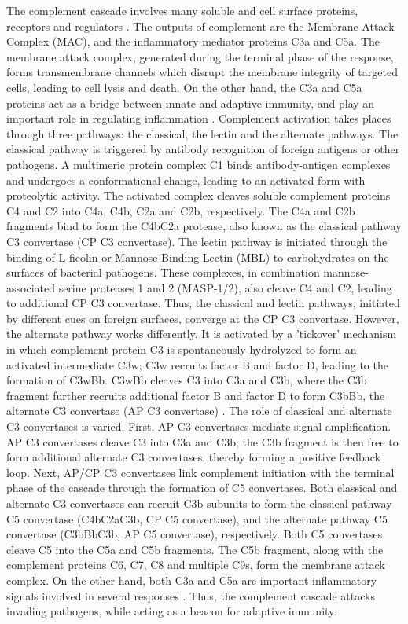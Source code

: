 \documentclass[12pt]{article}
\begin{document}
The complement cascade involves many soluble and cell surface proteins, receptors and regulators \cite{Walport:2001ab,Walport:2001aa}.
The outputs of complement are the Membrane Attack Complex (MAC), and the inflammatory mediator proteins C3a and C5a.
The membrane attack complex, generated during the terminal phase of the response,
forms transmembrane channels which disrupt the membrane integrity of targeted cells, leading to cell lysis and death.
On the other hand, the C3a and C5a proteins act as a bridge between innate and adaptive immunity, and play an important role in regulating inflammation \cite{sarma2011complement}.
Complement activation takes places through three pathways: the classical, the lectin and the alternate pathways.
The classical pathway is triggered by antibody recognition of foreign antigens or other pathogens.
A multimeric protein complex C1 binds antibody-antigen complexes and undergoes a conformational change, leading to an activated form with proteolytic activity.
The activated complex cleaves soluble complement proteins C4 and C2 into C4a, C4b, C2a and C2b, respectively.
The C4a and C2b fragments bind to form the C4bC2a protease, also known as the classical pathway C3 convertase (CP C3 convertase).
The lectin pathway is initiated through the binding of L-ficolin or Mannose Binding Lectin (MBL) to carbohydrates on the surfaces of bacterial pathogens.
These complexes, in combination mannose-associated serine proteases
1 and 2 (MASP-1/2), also cleave C4 and C2, leading to additional CP C3 convertase.
Thus, the classical and lectin pathways, initiated by different cues on foreign surfaces,  converge at the CP C3 convertase.
However, the alternate pathway works differently. It is activated by a 'tickover' mechanism in which complement protein C3 is spontaneously hydrolyzed to form an activated intermediate C3w;
C3w recruits factor B and factor D, leading to the formation of C3wBb. C3wBb cleaves C3 into C3a and C3b, where
the C3b fragment further recruits additional factor B and factor D to form C3bBb, the alternate C3 convertase (AP C3 convertase) \cite{pangburn1984alternative}.
The role of classical and alternate C3 convertases is varied.
First, AP C3 convertases mediate signal amplification.
AP C3 convertases cleave C3 into C3a and C3b; the C3b fragment is then free to form additional alternate C3 convertases,
thereby forming a positive feedback loop.
Next, AP/CP C3 convertases link complement initiation with the terminal phase of the cascade through the formation of C5 convertases.
Both classical and alternate C3 convertases can recruit C3b subunits to form the classical pathway C5 convertase (C4bC2aC3b, CP C5 convertase), and the alternate pathway C5 convertase (C3bBbC3b, AP C5 convertase), respectively. Both C5 convertases cleave C5 into the C5a and C5b fragments.
The C5b fragment, along with the complement proteins C6, C7, C8 and multiple C9s, form the membrane attack complex.
On the other hand, both C3a and C5a are important inflammatory signals involved in several responses \cite{Walport:2001ab,Walport:2001aa}.
Thus, the complement cascade attacks invading pathogens, while acting as a beacon for adaptive immunity.
\end{document}
